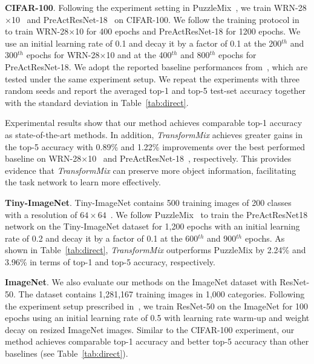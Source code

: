 \documentclass[10pt]{article} %
\newcommand{\TMIX}[0]{\textit{TransformMix }}
\begin{document}
\textbf{CIFAR-100}.
Following the experiment setting in PuzzleMix~\citep{puzzlemix}, we train WRN-28$\times$10~\citep{wrn} and PreActResNet-18~\citep{presnet} on CIFAR-100. We follow the training protocol in~\citep{puzzlemix} to train WRN-28$\times$10 for 400 epochs and PreActResNet-18 for 1200 epochs. We use an initial learning rate of 0.1 and decay it by a factor of 0.1 at the 200$^{th}$ and 300$^{th}$ epochs for WRN-28$\times$10 and at the 400$^{th}$ and 800$^{th}$ epochs for PreActResNet-18. We adopt the reported baseline performances from~\citep{puzzlemix}, which are tested under the same experiment setup. We repeat the experiments with three random seeds and report the averaged top-1 and top-5 test-set accuracy together with the standard deviation in Table~\ref{tab:direct}.

Experimental results show that our method achieves comparable top-1 accuracy as state-of-the-art methods. In addition, \TMIX achieves greater gains in the top-5 accuracy with 0.89\% and 1.22\% improvements over the best performed baseline on WRN-28$\times$10~\citep{wrn} and PreActResNet-18~\citep{presnet}, respectively. This provides evidence that \TMIX can preserve more object information, facilitating the task network to learn more effectively.

\textbf{Tiny-ImageNet}. Tiny-ImageNet contains 500 training images of 200 classes with a resolution of $64\times64$~\citep{tinyimagenet}. We follow PuzzleMix~\citep{puzzlemix} to train the PreActResNet18 network on the Tiny-ImageNet dataset for 1,200 epochs with an initial learning rate of 0.2 and decay it by a factor of 0.1 at the 600$^{th}$ and 900$^{th}$ epochs. As shown in Table~\ref{tab:direct}, \TMIX outperforms PuzzleMix by 2.24\% and 3.96\% in terms of top-1 and top-5 accuracy, respectively.

\textbf{ImageNet}. We also evaluate our methods on the ImageNet dataset with ResNet-50. The dataset contains 1,281,167 training images in 1,000 categories. Following the experiment setup prescribed in~\citep{puzzlemix}, we train ResNet-50 on the ImageNet for 100 epochs using an initial learning rate of 0.5 with learning rate warm-up and weight decay on resized ImageNet images. Similar to the CIFAR-100 experiment, our method achieves comparable top-1 accuracy and better top-5 accuracy than other baselines (see Table~\ref{tab:direct}).
\end{document}
